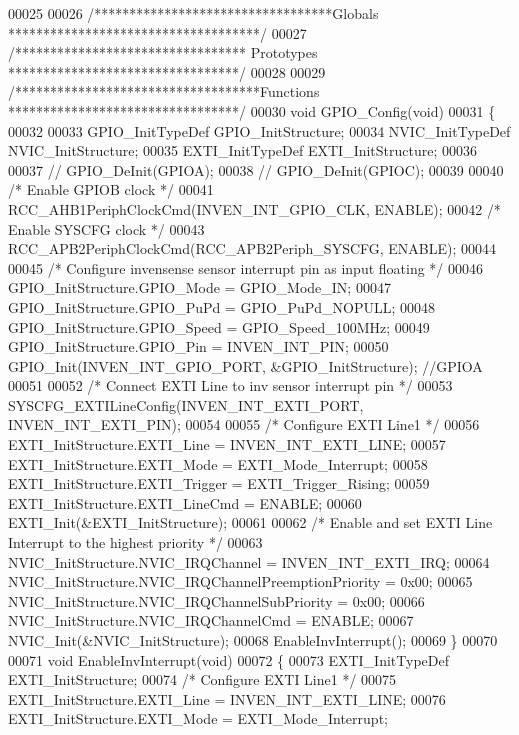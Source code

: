 \begin{DoxyCode}
00025 
00026 \textcolor{comment}{/**********************************Globals ************************************/}
00027 \textcolor{comment}{/********************************* Prototypes *********************************/}
00028 
00029 \textcolor{comment}{/***********************************Functions *********************************/}
00030 \textcolor{keywordtype}{void} GPIO_Config(\textcolor{keywordtype}{void})
00031 \{
00032 
00033   GPIO\_InitTypeDef   GPIO\_InitStructure;
00034   NVIC\_InitTypeDef   NVIC\_InitStructure;
00035   EXTI\_InitTypeDef   EXTI\_InitStructure;
00036 
00037 \textcolor{comment}{//  GPIO\_DeInit(GPIOA);}
00038 \textcolor{comment}{//  GPIO\_DeInit(GPIOC);}
00039 
00040   \textcolor{comment}{/* Enable GPIOB clock */}
00041   RCC_AHB1PeriphClockCmd(INVEN_INT_GPIO_CLK, ENABLE);
00042   \textcolor{comment}{/* Enable SYSCFG clock */}
00043   RCC_APB2PeriphClockCmd(RCC_APB2Periph_SYSCFG, ENABLE);
00044 
00045   \textcolor{comment}{/* Configure invensense sensor interrupt pin as input floating */}
00046   GPIO\_InitStructure.GPIO_Mode = GPIO_Mode_IN;
00047   GPIO\_InitStructure.GPIO_PuPd = GPIO_PuPd_NOPULL;
00048   GPIO\_InitStructure.GPIO_Speed = GPIO_Speed_100MHz;
00049   GPIO\_InitStructure.GPIO_Pin = INVEN_INT_PIN;
00050   GPIO_Init(INVEN_INT_GPIO_PORT, &GPIO\_InitStructure); \textcolor{comment}{//GPIOA}
00051 
00052   \textcolor{comment}{/* Connect EXTI Line to inv sensor interrupt pin */}
00053   SYSCFG_EXTILineConfig(INVEN_INT_EXTI_PORT, INVEN_INT_EXTI_PIN);
00054 
00055   \textcolor{comment}{/* Configure EXTI Line1 */}
00056   EXTI\_InitStructure.EXTI_Line = INVEN_INT_EXTI_LINE;
00057   EXTI\_InitStructure.EXTI_Mode = EXTI_Mode_Interrupt;
00058   EXTI\_InitStructure.EXTI_Trigger = EXTI_Trigger_Rising;
00059   EXTI\_InitStructure.EXTI_LineCmd = ENABLE;
00060   EXTI_Init(&EXTI\_InitStructure);
00061 
00062   \textcolor{comment}{/* Enable and set EXTI Line Interrupt to the highest priority */}
00063   NVIC\_InitStructure.NVIC_IRQChannel = INVEN_INT_EXTI_IRQ;
00064   NVIC\_InitStructure.NVIC_IRQChannelPreemptionPriority = 0x00;
00065   NVIC\_InitStructure.NVIC_IRQChannelSubPriority = 0x00;
00066   NVIC\_InitStructure.NVIC_IRQChannelCmd = ENABLE;
00067   NVIC_Init(&NVIC\_InitStructure);
00068   EnableInvInterrupt();
00069 \}
00070 
00071 \textcolor{keywordtype}{void} EnableInvInterrupt(\textcolor{keywordtype}{void})
00072 \{
00073   EXTI\_InitTypeDef   EXTI\_InitStructure;
00074   \textcolor{comment}{/* Configure EXTI Line1 */}
00075   EXTI\_InitStructure.EXTI_Line = INVEN_INT_EXTI_LINE;
00076   EXTI\_InitStructure.EXTI_Mode = EXTI_Mode_Interrupt;

\end{DoxyCode}

